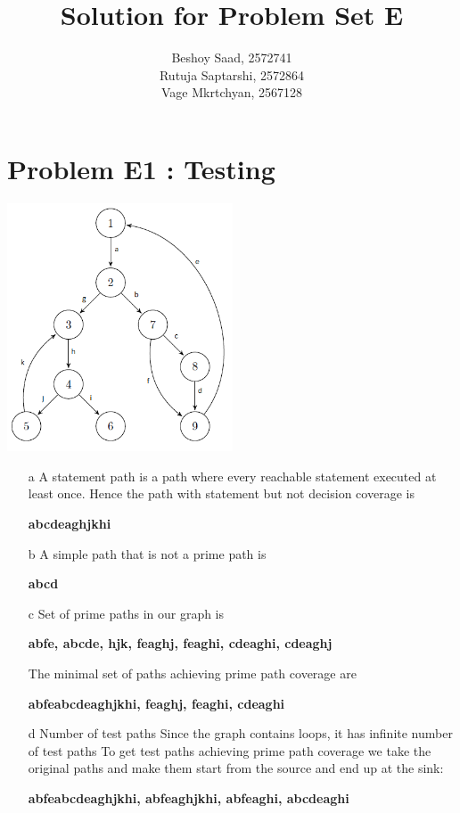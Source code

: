 \documentclass[]{article}
\title{Solution for Problem Set E}
\author{
	Beshoy Saad, 2572741\\
	Rutuja Saptarshi, 2572864\\
	Vage Mkrtchyan, 2567128
}
\begin{document}
\maketitle

\section{Problem E1 : Testing}
	\begin{center}
\includegraphics[height=2.9in]{E1}
	\end{center}
\begin{itemize}
	\item [a] A statement path is a path where every reachable statement executed at least once. Hence the path with statement but not decision coverage is
\begin{center}
	\large\textbf{abcdeaghjkhi}
\end{center}
	\item [b] A simple path that is not a prime path is 
\begin{center}
		\large\textbf{abcd}
\end{center}
	\item [c] Set of prime paths in our graph is
	\begin{center}
		\large\textbf{abfe, abcde, hjk, feaghj, feaghi, cdeaghi, cdeaghj}
	\end{center}
	The minimal set of paths achieving prime path coverage are
	\begin{center}
		\large\textbf{abfeabcdeaghjkhi, feaghj, feaghi, cdeaghi}
	\end{center}
\item [d] Number of test paths
\subitem[i] Since the graph contains loops, it has infinite number of test paths
\subitem[ii] To get test paths achieving prime path coverage we take the original paths and make them start from the source and end up at the sink:
\begin{center}
	\large\textbf{abfeabcdeaghjkhi, abfeaghjkhi, abfeaghi, abcdeaghi}
\end{center}
\end{itemize}
\end{document}
